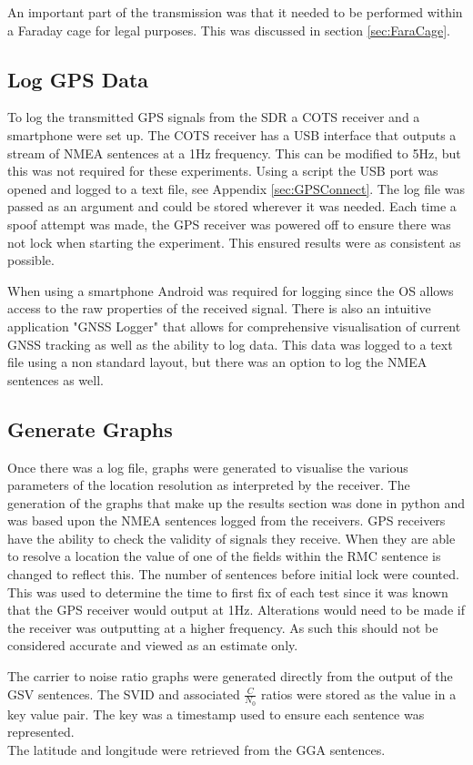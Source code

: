 An important part of the transmission was that it needed to be performed within a Faraday cage for legal purposes. This was discussed in section \ref{sec:FaraCage}.

\subsection{Log GPS Data}
To log the transmitted GPS signals from the SDR a COTS receiver and a smartphone were set up. The COTS receiver has a USB interface that outputs a stream of NMEA
sentences at a 1Hz frequency. This can be modified to 5Hz, but this was not required for these experiments. Using a script the USB port was opened and logged to a text
file, see Appendix \ref{sec:GPSConnect}. The log file was passed as an argument and could be stored wherever it was needed. Each time a spoof attempt was made, the GPS
receiver was powered off to ensure there was not lock when starting the experiment. This ensured results were as consistent as possible.

When using a smartphone Android was required for logging since the OS allows access to the raw properties of the received signal. There is also an intuitive application
"GNSS Logger" that allows for comprehensive visualisation of current GNSS tracking as well as the ability to log data. This data was logged to a text file using a non
standard layout, but there was an option to log the NMEA sentences as well.  

\subsection{Generate Graphs}
Once there was a log file, graphs were generated to visualise the various parameters of the location resolution as interpreted by the receiver. 
The generation of the graphs that make up the results section was done in python and was based upon the NMEA sentences logged from the receivers. GPS receivers have the
ability to check the validity of signals they receive. When they are able to resolve a location the value of one of the fields within the RMC sentence is changed to
reflect this. The number of sentences before initial lock were counted. This was
used to determine the time to first fix of each test since it was known that the GPS receiver would output at 1Hz. Alterations would need to be made if the receiver was
outputting at a higher frequency. As such this should not be considered accurate and viewed as an estimate only.

The carrier to noise ratio graphs were generated directly from the output of the GSV sentences. The SVID and associated $\frac{C}{N_0}$ ratios were stored as the value in
a key value pair. The key was a timestamp used to ensure each sentence was represented.\\
The latitude and longitude were retrieved from the GGA sentences.

